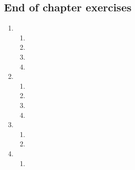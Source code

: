 \subsection{End of chapter exercises} %

\begin{enumerate}[noitemsep, label=\textbf{\arabic*}. ] 
\item %
 \begin{enumerate}[noitemsep, label=\textbf{(\alph*)} ]
\item %
\item %
\item %
\item %
\end{enumerate}
\item %
 \begin{enumerate}[noitemsep, label=\textbf{(\alph*)} ]
\item %
\item %
\item %
\item %
\end{enumerate}
\item %
 \begin{enumerate}[noitemsep, label=\textbf{(\alph*)} ]
\item %
\item %
\end{enumerate}
\item %
 \begin{enumerate}[noitemsep, label=\textbf{(\alph*)} ]
\item %
\begin{enumerate}[noitemsep, label=\textbf{\roman*}. ] 

\end{enumerate}
\end{enumerate}
\end{enumerate}
